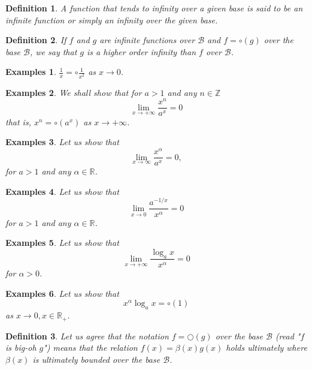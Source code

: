 \documentclass[a4paper,12pt]{article} %
\newtheorem{definition}{Definition}[section]
\newtheorem{example}{Examples}
\begin{document}
\begin{definition}
    A function that tends to infinity over a given base is said to 
    be an infinite function or simply an infinity over the given base.
\end{definition}

\begin{definition}
    If $f$ and $g$ are infinite functions over $\mathcal{B}$ and 
    $f = \circ(g)$ over the base $\mathcal{B}$, we say that $g$
    is a higher order infinity than $f$ over $\mathcal{B}$.
\end{definition}

\begin{example}
    $\displaystyle \frac{1}{x} = \circ\frac{1}{x^2}$ as $x \to 0$.
\end{example}

\begin{example}
    We shall show that for $a > 1$ and any $n \in \mathbb{Z}$
    \[
        \lim_{x\to +\infty} \frac{x^n}{a^x} = 0
    \]
    that is, $x^n = \circ(a^x)$ as $x \to +\infty$.
\end{example}

\begin{example}
    Let us show that 
    \[
        \lim_{x \to \infty} \frac{x^{\alpha}}{a^x} = 0,
    \]
for $a > 1 $ and any $\alpha \in \mathbb{R}$.
\end{example}

\begin{example}
    Let us show that 
    \[
        \lim_{x \to 0}\frac{a^{-1/x}}{x^{\alpha}} = 0
        \]
    for $a > 1$ and any $\alpha \in \mathbb{R}$.
\end{example}

\begin{example}
    Let us show that 
    \[
        \lim_{x \to +\infty} \frac{\log_ax}{x^{\alpha}} = 0
        \]
    for $\alpha>0$.
\end{example}

\begin{example}
    Let us show that 
    \[
        x^{\alpha}\log_ax = \circ(1)
        \]
    as $x \to 0, x \in \mathbb{R}_+$.
\end{example}

\begin{definition}
    Let us agree that the notation $f = \bigcirc(g)$ over the base $\mathcal{B}$
    (read "$f$ is big-oh $g$") means that the relation $f(x) = \beta(x)g(x)$
    holds ultimately where $\beta(x)$ is ultimately bounded over the base 
    $\mathcal{B}$.
\end{definition}
\end{document}
